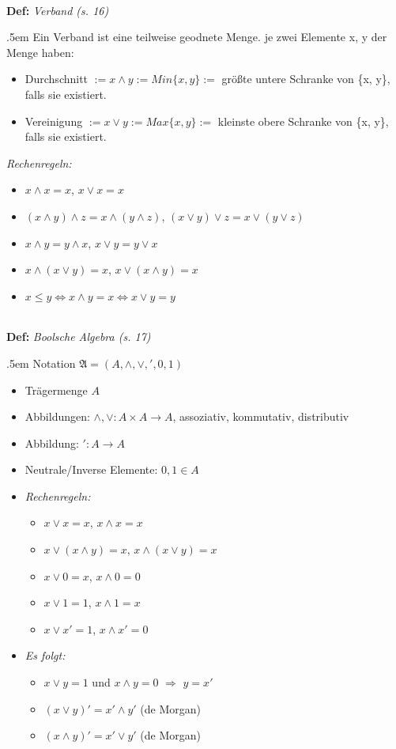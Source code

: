 \documentclass[twocolumn, 10pt]{article}
\newenvironment {definition}
                [1][]
                {\noindent\\{\bf
                Def:}\emph{
                #1}\indent\begin{addmargin}{.5em}}{\end{addmargin}}
\newcommand{\und}{\wedge}
\newcommand{\oder}{\vee}
\begin{document}
\begin{definition}[Verband (s. 16)]
Ein Verband ist eine teilweise geodnete Menge. je zwei Elemente x, y der Menge
haben:
\begin{itemize}
  \item Durchschnitt $:= x \und y :=Min\{x, y\}:=$ größte untere Schranke von
  \{x, y\}, falls sie existiert.
  \item Vereinigung $:=x\oder y :=Max\{x, y\}:=$ kleinste obere Schranke von
  \{x, y\}, falls sie existiert.
\end{itemize}
\emph{Rechenregeln:}
\begin{itemize}
  \item $x \und x = x$, $x \oder x = x$
  \item $(x \und y) \und z = x \und (y \und z)$, $(x \oder y) \oder z = x \oder (y
  \oder z)$
  \item $x \und y = y \und x$, $x \oder y = y \oder x$
  \item $x \und (x \oder y) = x$, $x \oder (x \und y) = x$
  \item $x \leq y \Leftrightarrow x \und y = x \Leftrightarrow x\oder y = y$
\end{itemize}
\end{definition}

\begin{definition}[Boolsche Algebra (s. 17)]
Notation $\mathfrak{A}=(A, \und, \oder, ', 0, 1)$
\begin{itemize}
  \item Trägermenge $A$
  \item Abbildungen: $\und, \oder: A\times A \rightarrow A$, assoziativ,
  kommutativ, distributiv
  \item Abbildung: $': A \rightarrow A$
  \item Neutrale/Inverse Elemente: $0, 1 \in A$
  \item \emph{Rechenregeln:}\begin{itemize}
    \item $x \oder x = x$, $x \und x = x$
    \item $x \oder (x \und y) = x$, $x \und (x \oder y) = x$
    \item $x \oder 0 = x$, $x \und 0 = 0$
    \item $x \oder 1 = 1$, $x \und 1 = x$
    \item $x \oder x' = 1$, $x \und x' = 0$
  \end{itemize}
  \item \emph{Es folgt:} \begin{itemize}
    \item $x \oder y = 1$ und $x \und y = 0$ $\Longrightarrow$ $y = x'$
    \item $(x \oder y)' = x' \und y'$ (de Morgan)
    \item $(x \und y)' = x' \oder y'$ (de Morgan)
  \end{itemize}
\end{itemize}
\end{definition}
\end{document}
